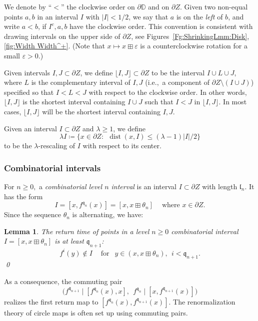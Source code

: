 \documentclass{amsart}
\renewcommand{\sp}{{\ \ }}
\newcommand{\1}{{\mathbb 1 }}
\newcommand{\qq}{\mathfrak{q}}
\newcommand{\length}{{\mathfrak l}}
\newcommand{\Disk}{\mathbb{D}}
\newtheorem{lem}[thm]{Lemma}
\theoremstyle{remark}
\numberwithin{equation}{section}
\theoremstyle{definition}
\newcommand{\dist}{\operatorname{dist}}
\begin{document}
We denote by ``$<$'' the clockwise order on $\partial \Disk$ and on $\partial Z$. Given two non-equal points $a,b$ in an interval $I $ with $ |I|<1/2$, we say that $a$ is on the \emph{left} of $b$, and write $a<b$, if $I^c, a,b$ have the clockwise order. This convention is consistent with drawing intervals on the upper side of $\partial Z$, see Figures~\ref{Fg:ShrinkingLmm:Disk}, \ref{fig:Width Width^+}. (Note that $x\mapsto x\boxplus \varepsilon$ is a counterclockwise rotation for a small $\varepsilon>0$.)


Given intervals $I,J\subset \partial  Z$, we define $\lfloor I,J\rfloor \subset \partial  Z$ to be the interval $I\cup L\cup J$, where $L$ is the complementary interval of $I,J$ (i.e.,~a component of $\partial Z\setminus (I\cup J)$) specified so that $I< L <J$ with respect to the clockwise order. In other words, $\lfloor I,J\rfloor$ is the shortest interval containing $I\cup J$ such that $I<J$ in $\lfloor I,J\rfloor$. In most cases, $\lfloor I,J\rfloor$ will be the shortest interval containing $I,J$.



Given an interval $I\subset \partial Z$ and $\lambda \ge 1$, we define
\begin{equation}
\label{eq:dfn:lambdaI}
\lambda I \coloneqq \{x\in \partial Z:\sp  \dist(x , I) \le (\lambda-1)|I|/2\}
\end{equation}
to be the $\lambda$-rescaling of $I$ with respect to its center.




\subsubsection{Combinatorial intervals}
For $n\ge0,$ a \emph{combinatorial level $n$ interval} is an interval $I\subset \partial Z$ with length $\length_n$. It has the form \[I=[x,f^{\qq_n}(x)]=[x,x \boxplus\theta_n] \sp\sp\text{ where }x\in \partial Z. \]
Since the sequence $\theta_n$ is alternating, we have:

\begin{lem}
\label{lem:FirstLand}
The return time of points in a level $n\ge 0$ combinatorial interval $I=[x,x \boxplus\theta_n]$ is at least $\qq_{n+1}$:
\begin{equation}
f^i(y)\not\in I \sp\sp \text{ for }\sp  y\in (x,x \boxplus\theta_n),\sp  i< \qq_{n+1}. 
\end{equation}\qed
\end{lem}

As a consequence, the commuting pair 
\begin{equation}
\label{eq:ren:com_pair}
\big(f^{\qq_{n+1}}\mid [f^{\qq_n}(x),x],\sp  f^{\qq_{n}}\mid [x,f^{\qq_{n+1}}(x)]\big)
\end{equation}  
realizes the first return map to $[f^{\qq_n}(x), f^{\qq_{n+1}}(x)]$. The renormalization theory of circle maps is often set up using commuting pairs.
\end{document}
